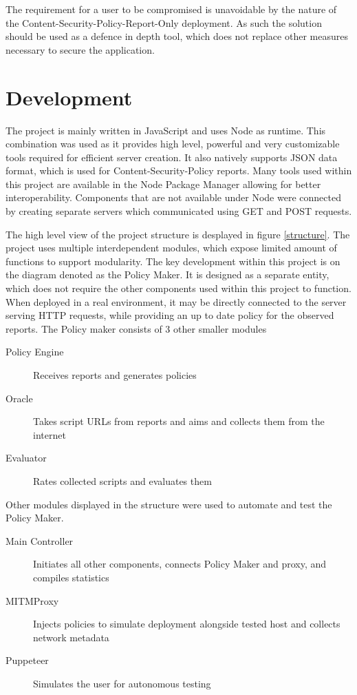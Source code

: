 The requirement for a user to be compromised is unavoidable by the nature of the Content-Security-Policy-Report-Only deployment.
As such the solution should be used as a defence in depth tool, which does not replace other measures necessary to secure the application.

\section{Development}

The project is mainly written in JavaScript and uses Node as runtime.
This combination was used as it provides high level, powerful and very customizable tools required for efficient server creation.
It also natively supports JSON data format, which is used for Content-Security-Policy reports.
Many tools used within this project are available in the Node Package Manager allowing for better interoperability.
Components that are not available under Node were connected by creating separate servers which communicated using GET and POST requests.

The high level view of the project structure is desplayed in figure \ref{structure}.
The project uses multiple interdependent modules, which expose limited amount of functions to support modularity.
The key development within this project is on the diagram denoted as the Policy Maker.
It is designed as a separate entity, which does not require the other components used within this project to function.
When deployed in a real environment, it may be directly connected to the server serving HTTP requests, while providing an up to date policy for the observed reports.
The Policy maker consists of 3 other smaller modules 
\begin{description}
	\item[Policy Engine] Receives reports and generates policies
	\item[Oracle] Takes script URLs from reports and aims and collects them from the internet
	\item[Evaluator] Rates collected scripts and evaluates them
\end{description}

Other modules displayed in the structure were used to automate and test the Policy Maker.
\begin{description}
	\item[Main Controller] Initiates all other components, connects Policy Maker and proxy, and compiles statistics
	\item[MITMProxy] Injects policies to simulate deployment alongside tested host and collects network metadata
	\item[Puppeteer] Simulates the user for autonomous testing
\end{description}

